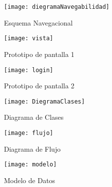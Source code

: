 \documentclass[12pt]{article}
\begin{document}
\newpage

%
\newpage
\begin{figure}
  \centering
      \texttt{[image: diegramaNavegabilidad]}
	    \caption{Esquema Navegacional}
	\label{fig:diagrama_Navegabilidad}
\end{figure}

\begin{figure}
  \centering
      \texttt{[image: vista]}
	    \caption{Prototipo de pantalla 1}
	\label{fig:vista}
\end{figure}

\begin{figure}
  \centering
      \texttt{[image: login]}
	    \caption{Prototipo de pantalla 2}
	\label{fig:login}
\end{figure}

\begin{figure}
  \centering
      \texttt{[image: DiegramaClases]}
	    \caption{Diagrama de Clases}
	\label{fig:DiagramaClases}
\end{figure}

\begin{figure}
  \centering
      \texttt{[image: flujo]}
	    \caption{Diagrama de Flujo}
	\label{fig:diagramaflujo}
\end{figure}

\begin{figure}
  \centering
      \texttt{[image: modelo]}
	    \caption{Modelo de Datos}
	\label{fig:moddatos}
\end{figure}
\end{document}
